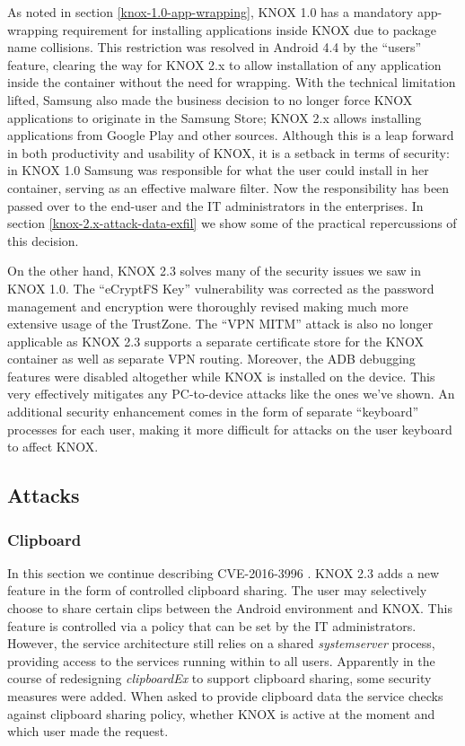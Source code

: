 \documentclass[11pt]{article}
\begin{document}
As noted in section \ref{knox-1.0-app-wrapping}, KNOX 1.0 has a mandatory app-wrapping requirement for installing applications inside KNOX due to 
package name collisions.
This restriction was resolved in Android 4.4 by the ``users'' feature, clearing the way for KNOX 2.x to allow installation of any
application inside the container without the need for wrapping. 
With the technical limitation lifted, Samsung also made the business decision to no longer force KNOX applications to originate in the Samsung Store; 
KNOX 2.x allows installing applications from Google Play and other sources.
Although this is a leap forward in both productivity and usability of KNOX, it is a setback in terms of security: 
in KNOX 1.0 Samsung was responsible for what the user could install in her container, serving as an effective malware filter. 
Now the responsibility has been passed over to the end-user and the IT administrators in the enterprises.
In section \ref{knox-2.x-attack-data-exfil} we show some of the practical repercussions of this decision.

On the other hand, KNOX 2.3 solves many of the security issues we saw in KNOX 1.0.
The ``eCryptFS Key'' vulnerability was corrected as the password management and encryption were thoroughly revised making much more extensive usage 
of the TrustZone.
The ``VPN MITM'' attack is also no longer applicable as KNOX 2.3 supports a separate certificate store for the KNOX container as well as separate 
VPN routing. Moreover, the ADB debugging features were disabled altogether while KNOX is installed on the device. This very effectively mitigates any
PC-to-device attacks like the ones we've shown. An additional security enhancement comes in the form of separate ``keyboard'' processes for each user, 
making it more difficult for attacks on the user keyboard to affect KNOX.

\subsection{Attacks} \label{knox-2.x-attacks}
\subsubsection{Clipboard} \label{knox-2.x-attack-clipboard}
In this section we continue describing CVE-2016-3996 \cite{CVE-2016-3996}.
KNOX 2.3 adds a new feature in the form of controlled clipboard sharing. The user may selectively choose to share certain clips between the Android 
environment and KNOX.
This feature is controlled via a policy that can be set by the IT administrators.
However, the service architecture still relies on a shared \emph{system\textunderscore server} process, providing access to the 
services running within to all users. Apparently in the course of redesigning \emph{clipboardEx} to support clipboard sharing, some security measures 
were added. When asked to provide clipboard data the service checks against clipboard sharing policy, whether KNOX is active at the moment and which user made 
the request. 
\end{document}
